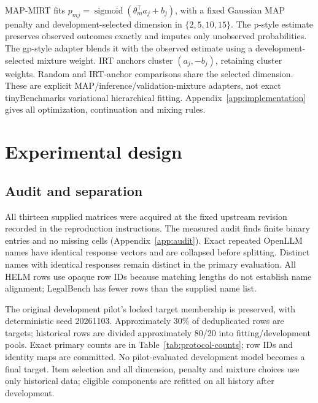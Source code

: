 \documentclass{article}
\begin{document}
MAP-MIRT fits $p_{mj}=\operatorname{sigmoid}(\theta_m^\top a_j+b_j)$, with a fixed Gaussian MAP penalty and development-selected dimension in $\{2,5,10,15\}$. The p-style estimate preserves observed outcomes exactly and imputes only unobserved probabilities. The gp-style adapter blends it with the observed estimate using a development-selected mixture weight. IRT anchors cluster $(a_j,-b_j)$, retaining cluster weights. Random and IRT-anchor comparisons share the selected dimension. These are explicit MAP/inference/validation-mixture adapters, not exact tinyBenchmarks variational hierarchical fitting. Appendix~\ref{app:implementation} gives all optimization, continuation and mixing rules.

\section{Experimental design}\label{sec:protocol}
\subsection{Audit and separation}
All thirteen supplied matrices were acquired at the fixed upstream revision recorded in the reproduction instructions. The measured audit finds finite binary entries and no missing cells (Appendix~\ref{app:audit}). Exact repeated OpenLLM names have identical response vectors and are collapsed before splitting. Distinct names with identical responses remain distinct in the primary evaluation. All HELM rows use opaque row IDs because matching lengths do not establish name alignment; LegalBench has fewer rows than the supplied name list.

The original development pilot's locked target membership is preserved, with deterministic seed 20261103. Approximately 30\% of deduplicated rows are targets; historical rows are divided approximately 80/20 into fitting/development pools. Exact primary counts are in Table~\ref{tab:protocol-counts}; row IDs and identity maps are committed. No pilot-evaluated development model becomes a final target. Item selection and all dimension, penalty and mixture choices use only historical data; eligible components are refitted on all history after development.
\end{document}
